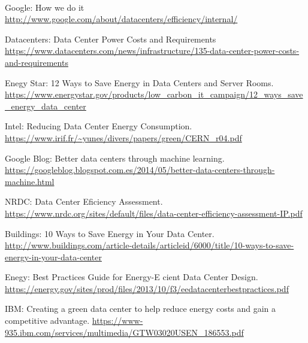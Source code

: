 \documentclass[10pt]{article}
\begin{document}
  	\paragraph{}
	\clearpage
  \begin{thebibliography}{9}
    	Google: How we do it \url{http://www.google.com/about/datacenters/efficiency/internal/}
        
    	Datacenters: Data Center Power Costs and Requirements \url{https://www.datacenters.com/news/infrastructure/135-data-center-power-costs-and-requirements}

		Enegy Star: 12 Ways to Save Energy in Data Centers and Server Rooms. \newline \url{https://www.energystar.gov/products/low_carbon_it_campaign/12_ways_save_energy_data_center}

    Intel: Reducing Data Center Energy Consumption. \newline
 		\url{https://www.irif.fr/~yunes/divers/papers/green/CERN_r04.pdf}

    Google Blog: Better data centers through machine learning. \newline
		\url{https://googleblog.blogspot.com.es/2014/05/better-data-centers-through-machine.html}

    NRDC: Data Center Eficiency Assessment. \newline
 		\url{https://www.nrdc.org/sites/default/files/data-center-efficiency-assessment-IP.pdf}

    Buildings: 10 Ways to Save Energy in Your Data Center. \newline \url{http://www.buildings.com/article-details/articleid/6000/title/10-ways-to-save-energy-in-your-data-center}

		Enegy: Best Practices Guide for Energy-E cient Data Center Design. \newline
		\url{https://energy.gov/sites/prod/files/2013/10/f3/eedatacenterbestpractices.pdf}

		IBM: Creating a green data center to help reduce energy costs and gain a competitive advantage. \newline
		\url{https://www-935.ibm.com/services/multimedia/GTW03020USEN_186553.pdf}


\end{thebibliography}
\end{document}
